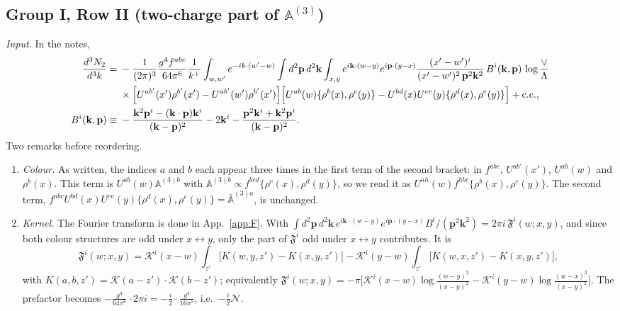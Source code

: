 \documentclass[10pt]{article}
\numberwithin{equation}{section}
\newcommand{\KK}{\mathcal K}
\newcommand{\NN}{\mathcal N}
\begin{document}
\subsection{Group I, Row II (two-charge part of $\mathbb A^{(3)}$)}\label{sec:GI.II}
\emph{Input.} In the notes,
\begin{align*}
\frac{d^3N_2}{d^3k}={}&-\frac{1}{(2\pi)^3}\frac{g^4f^{abc}}{64\pi^6}\frac1{k^+}\int_{w,w'}e^{-ik\cdot(w'-w)}\int d^2\mathbf p\,d^2\mathbf k\int_{x,y}e^{i\mathbf k\cdot(w-y)}e^{i\mathbf p\cdot(y-x)}\frac{(x'-w')^i}{(x'-w')^2\,\mathbf p^2\mathbf k^2}\,B^i(\mathbf k,\mathbf p)\,\log\frac{\vee}{\Lambda}\\
&\times\Big[U^{ab'}(x')\rho^{b'}(x')-U^{ab'}(w')\rho^{b'}(x')\Big]\Big[U^{ab}(w)\{\rho^b(x),\rho^c(y)\}-U^{bd}(x)U^{ce}(y)\{\rho^d(x),\rho^e(y)\}\Big]+{\rm c.c.},\\
B^i(\mathbf k,\mathbf p)\equiv{}&-\frac{\mathbf k^2\mathbf p^i-(\mathbf k\cdot\mathbf p)\mathbf k^i}{(\mathbf k-\mathbf p)^2}-2\mathbf k^i-\frac{\mathbf p^2\mathbf k^i+\mathbf k^2\mathbf p^i}{(\mathbf k-\mathbf p)^2}.
\end{align*}
Two remarks before reordering.
\begin{enumerate}
\item \emph{Colour.} As written, the indices $a$ and $b$ each appear three times in the first term of the second bracket: in $f^{abc}$, $U^{ab'}(x')$, $U^{ab}(w)$ and $\rho^b(x)$. This term is $U^{ab}(w)\mathbb A^{(3)b}$ with $\mathbb A^{(3)b}\propto f^{bcd}\{\rho^c(x),\rho^d(y)\}$, so we read it as $U^{ah}(w)f^{hbc}\{\rho^b(x),\rho^c(y)\}$. The second term, $f^{abc}U^{bd}(x)U^{ce}(y)\{\rho^d(x),\rho^e(y)\}=\bar{\mathbb A}^{(3)a}$, is unchanged.
\item \emph{Kernel.} The Fourier transform is done in App.~\ref{app:F}. With $\int d^2\mathbf p\,d^2\mathbf k\,e^{i\mathbf k\cdot(w-y)}e^{i\mathbf p\cdot(y-x)}B^i/(\mathbf p^2\mathbf k^2)=2\pi i\,\mathfrak F^i(w;x,y)$, and since both colour structures are odd under $x\leftrightarrow y$, only the part of $\mathfrak F^i$ odd under $x\leftrightarrow y$ contributes. It is
\begin{equation*}
\mathfrak F^i(w;x,y)=\KK^i(x-w)\int_{z'}\big[K(w,y,z')-K(x,y,z')\big]-\KK^i(y-w)\int_{z'}\big[K(w,x,z')-K(x,y,z')\big],
\end{equation*}
with $K(a,b,z')=\KK(a-z')\cdot\KK(b-z')$; equivalently $\mathfrak F^i(w;x,y)=-\pi\big[\KK^i(x-w)\log\frac{(w-y)^2}{(x-y)^2}-\KK^i(y-w)\log\frac{(w-x)^2}{(x-y)^2}\big]$. The prefactor becomes $-\frac{g^4}{64\pi^6}\cdot2\pi i=-\frac{i}{2}\cdot\frac{g^4}{16\pi^5}$, i.e.\ $-\frac i2\NN$.
\end{enumerate}
\end{document}
